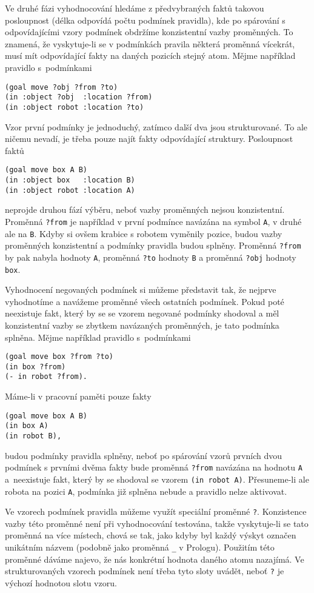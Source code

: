 Ve druhé fázi vyhodnocování hledáme z předvybraných faktů takovou posloupnost
(délka odpovídá počtu podmínek pravidla), kde po spárování s odpovídajícími
vzory podmínek obdržíme konzistentní vazby proměnných. To znamená, že
vyskytuje-li se v podmínkách pravila některá proměnná vícekrát, musí mít
odpovídající fakty na daných pozicích stejný atom.  Mějme například pravidlo
s~podmínkami
\begin{verbatim}
(goal move ?obj ?from ?to)
(in :object ?obj  :location ?from)
(in :object robot :location ?to)
\end{verbatim}
Vzor první podmínky je jednoduchý, zatímco další dva jsou strukturované. To ale
ničemu nevadí, je třeba pouze najít fakty odpovídající struktury. Posloupnost
faktů
\begin{verbatim}
(goal move box A B)
(in :object box   :location B)
(in :object robot :location A)
\end{verbatim}
neprojde druhou fází výběru, neboť vazby proměnných nejsou konzistentní.
Proměnná \verb|?from| je například v první podmínce navázána na symbol \verb|A|, v
druhé ale na \verb|B|. Kdyby si ovšem krabice s robotem vyměnily pozice, budou
vazby proměnných konzistentní a podmínky pravidla budou splněny. Proměnná
\verb|?from| by pak nabyla hodnoty \verb|A|, proměnná \verb|?to| hodnoty
\verb|B| a proměnná \verb|?obj| hodnoty \verb|box|.

Vyhodnocení negovaných podmínek si můžeme představit tak, že nejprve vyhodnotíme
a navážeme proměnné všech ostatních podmínek. Pokud poté neexistuje fakt, který
by se se vzorem negované podmínky shodoval a měl konzistentní vazby se zbytkem navázaných
proměnných, je tato podmínka splněna. Mějme například pravidlo s~podmínkami
\begin{verbatim}
(goal move box ?from ?to)
(in box ?from)
(- in robot ?from).
\end{verbatim}
Máme-li v pracovní paměti pouze fakty
\begin{verbatim}
(goal move box A B)
(in box A)
(in robot B),
\end{verbatim}
budou podmínky pravidla splněny, neboť po spárování vzorů prvních dvou podmínek
s prvními dvěma fakty bude proměnná \verb|?from| navázána na hodnotu \verb|A|
a~neexistuje fakt, který by se shodoval se vzorem \verb|(in robot A)|. Přesuneme-li
ale robota na pozici \verb|A|, podmínka již splněna nebude a pravidlo nelze
aktivovat.

Ve vzorech podmínek pravidla můžeme využít speciální proměnné \verb|?|.
Konzistence vazby této proměnné není při vyhodnocování testována, takže
vyskytuje-li se tato proměnná na více místech, chová se tak, jako kdyby byl
každý výskyt označen unikátním názvem (podobně jako proměnná \verb|_| v
Prologu). Použitím této proměnné dáváme najevo, že nás konkrétní hodnota daného
atomu nazajímá. Ve strukturovaných vzorech podmínek není třeba tyto sloty uvádět,
neboť \verb|?| je výchozí hodnotou slotu vzoru.

